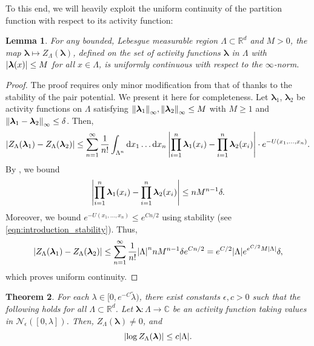 \documentclass[11pt]{article}
\newcommand{\R}{\mathbb R}
\newcommand{\C}{\mathbb C}
\newcommand{\bl}{\bm{\lambda}}
\newcommand{\lsconst}{C}
\numberwithin{equation}{section}
\theoremstyle{plain}
\newtheorem{theorem}{Theorem}[section]
\newtheorem{lemma}[theorem]{Lemma}
\theoremstyle{definition}
\theoremstyle{remark}
\begin{document}
To this end, we will heavily exploit the uniform continuity of the partition function with respect to its activity function:

\begin{lemma}
\label{lem:zero-freeness_Z-uniform-continuity}
For any bounded, Lebesgue measurable region $\Lambda\subset\R^{d}$ and $M>0$, the map $\bl\mapsto Z_{\Lambda}(\bl)$, defined on the set of activity functions $\bl$ in $\Lambda$ with $\abs{\bl(x)}\le M$ for all $x\in\Lambda$, is uniformly continuous with respect to the $\infty$-norm.
\end{lemma}

\begin{proof}
The proof requires only minor modification from that of \cite[Lemma 9]{michelen2023analyticity} thanks to the stability of the pair potential.
We present it here for completeness.
Let $\bl_{1}$, $\bl_{2}$ be activity functions on $\Lambda$ satisfying $\norm{\bl_{1}}_{\infty},\norm{\bl_{2}}_{\infty}\le M$ with $M\ge 1$ and $\norm{\bl_{1}-\bl_{2}}_{\infty}\le\delta$.
Then,
\begin{equation}
\abs{Z_{\Lambda}(\bl_{1})-Z_{\Lambda}(\bl_{2})}
\le\sum_{n=1}^{\infty}\frac{1}{n!}\int_{\Lambda^{n}}\dd{x}_{1}\dots\dd{x}_{n}\abs{\prod_{i=1}^{n}\bl_{1}(x_{i})-\prod_{i=1}^{n}\bl_{2}(x_{i})}\cdot e^{-U(x_{1},\dots,x_{n})}.
\end{equation}
By \cite[Lemma 10]{michelen2023analyticity}, we bound
\begin{equation}
\abs{\prod_{i=1}^{n}\bl_{1}(x_{i})-\prod_{i=1}^{n}\bl_{2}(x_{i})}
\le nM^{n-1}\delta.
\end{equation}
Moreover, we bound $e^{-U(x_{1},\dots,x_{n})}\le e^{\lsconst n/2}$ using stability (see \eqref{eqn:introduction_stability}).
Thus,
\begin{equation}
\abs{Z_{\Lambda}(\bl_{1})-Z_{\Lambda}(\bl_{2})}
\le\sum_{n=1}^{\infty}\frac{1}{n!}\abs{\Lambda}^{n}nM^{n-1}\delta e^{\lsconst n/2}
=e^{\lsconst/2}\abs{\Lambda}e^{e^{\lsconst/2}M\abs{\Lambda}}\delta,
\end{equation}
which proves uniform continuity.
\end{proof}

\begin{theorem}
\label{thm:zero-freeness}
For each $\lambda\in[0,e^{-\lsconst}\tilde{\lambda})$, there exist constants $\epsilon,c>0$ such that the following holds for all $\Lambda\subset\R^{d}$.
Let $\bl:\Lambda\rightarrow\C$ be an activity function taking values in $\mathcal{N}_{\epsilon}([0,\lambda])$.
Then, $Z_{\Lambda}(\bl)\ne 0$, and
\begin{equation}
\abs{\log Z_{\Lambda}(\bl)}\le c\abs{\Lambda}.
\end{equation}
\end{theorem}
\end{document}
